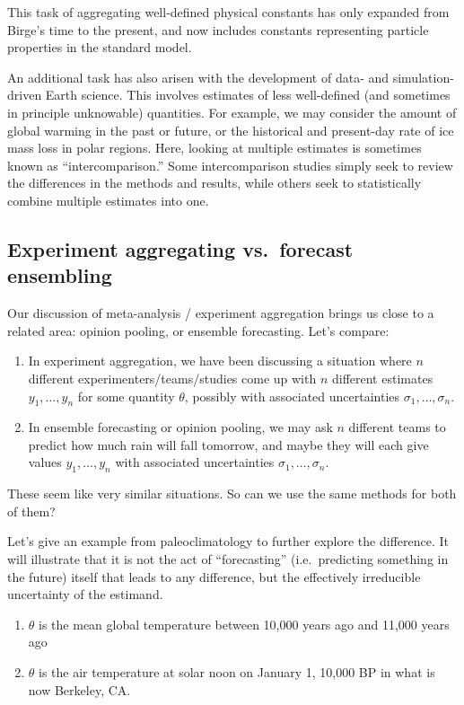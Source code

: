 \documentclass[12pt]{article}
\begin{document}
This task of aggregating well-defined physical constants has only expanded from Birge's time to the present, and now includes constants representing particle properties in the standard model.

An additional task has also arisen with the development of data- and simulation-driven Earth science. This involves estimates of less well-defined (and sometimes in principle unknowable) quantities. For example, we may consider the amount of global warming in the past or future, or the historical and present-day rate of ice mass loss in polar regions. Here, looking at multiple estimates is sometimes known as ``intercomparison.'' Some intercomparison studies simply seek to review the differences in the methods and results, while others seek to statistically combine multiple estimates into one.

\subsection{Experiment aggregating vs.~forecast ensembling}

Our discussion of meta-analysis / experiment aggregation brings us close to a related area: opinion pooling, or ensemble forecasting. Let's compare:

\begin{enumerate}
\item
  In experiment aggregation, we have been discussing a situation where $n$ different experimenters/teams/studies come up with $n$ different estimates $y_1,\ldots,y_n$ for some quantity $\theta$, possibly with associated uncertainties $\sigma_1,\ldots,\sigma_n$.
\item
  In ensemble forecasting or opinion pooling, we may ask $n$ different teams to predict how much rain will fall tomorrow, and maybe they will each give values $y_1,\ldots,y_n$ with associated uncertainties $\sigma_1,\ldots,\sigma_n$.
\end{enumerate}

These seem like very similar situations. So can we use the same methods for both of them?

Let's give an example from paleoclimatology to further explore the difference. It will illustrate that it is not the act of ``forecasting'' (i.e.~predicting something in the future) itself that leads to any difference, but the effectively irreducible uncertainty of the estimand.

\begin{enumerate}
\item
  $\theta$ is the mean global temperature between 10,000 years ago and 11,000 years ago
\item
  $\theta$ is the air temperature at solar noon on January 1, 10,000 BP in what is now Berkeley, CA.
\end{enumerate}
\end{document}
